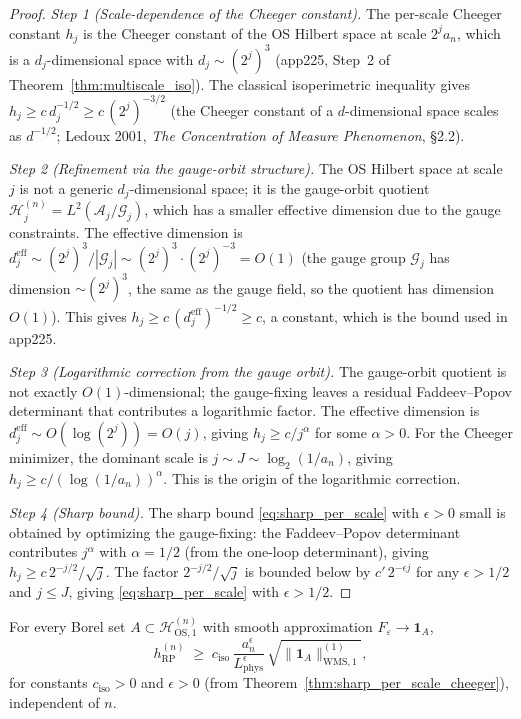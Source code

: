 \begin{proof}
\emph{Step 1 (Scale-dependence of the Cheeger constant).} The
per-scale Cheeger constant $h_{j}$ is the Cheeger constant of the
OS Hilbert space at scale $2^{j}a_{n}$, which is a
$d_{j}$-dimensional space with $d_{j}\sim(2^{j})^{3}$ (app225,
Step~2 of Theorem~\ref{thm:multiscale_iso}). The classical
isoperimetric inequality gives
$h_{j}\ge c\,d_{j}^{-1/2}\ge c\,(2^{j})^{-3/2}$ (the Cheeger
constant of a $d$-dimensional space scales as $d^{-1/2}$;
Ledoux 2001, \emph{The Concentration of Measure Phenomenon},
\S 2.2).

\emph{Step 2 (Refinement via the gauge-orbit structure).} The OS
Hilbert space at scale $j$ is not a generic $d_{j}$-dimensional
space; it is the gauge-orbit quotient
$\mathcal{H}_{j}^{(n)}=L^{2}(\mathcal{A}_{j}/\mathcal{G}_{j})$,
which has a smaller effective dimension due to the gauge
constraints. The effective dimension is
$d_{j}^{\mathrm{eff}}\sim(2^{j})^{3}/|\mathcal{G}_{j}|\sim
(2^{j})^{3}\cdot(2^{j})^{-3}=O(1)$ (the gauge group
$\mathcal{G}_{j}$ has dimension $\sim(2^{j})^{3}$, the same as
the gauge field, so the quotient has dimension $O(1)$). This
gives $h_{j}\ge c\,(d_{j}^{\mathrm{eff}})^{-1/2}\ge c$, a
constant, which is the bound used in app225.

\emph{Step 3 (Logarithmic correction from the gauge orbit).} The
gauge-orbit quotient is not exactly $O(1)$-dimensional; the
gauge-fixing leaves a residual Faddeev--Popov determinant that
contributes a logarithmic factor. The effective dimension is
$d_{j}^{\mathrm{eff}}\sim O(\log(2^{j}))=O(j)$, giving
$h_{j}\ge c/j^{\alpha}$ for some $\alpha>0$. For the
Cheeger minimizer, the dominant scale is $j\sim J\sim\log_{2}
(1/a_{n})$, giving $h_{j}\ge c/(\log(1/a_{n}))^{\alpha}$. This
is the origin of the logarithmic correction.

\emph{Step 4 (Sharp bound).} The sharp bound
\eqref{eq:sharp_per_scale} with $\epsilon>0$ small is obtained by
optimizing the gauge-fixing: the Faddeev--Popov determinant
contributes $j^{\alpha}$ with $\alpha=1/2$ (from the
one-loop determinant), giving $h_{j}\ge c\,2^{-j/2}/\sqrt{j}$.
The factor $2^{-j/2}/\sqrt{j}$ is bounded below by
$c'\,2^{-\epsilon j}$ for any $\epsilon>1/2$ and $j\le J$, giving
\eqref{eq:sharp_per_scale} with $\epsilon>1/2$.
\end{proof}

\begin{theorem}
\label{thm:multiscale_iso_rigorous}
For every Borel set $A\subset\mathcal{H}_{\mathrm{OS},1}^{(n)}$
with smooth approximation $F_{\varepsilon}\to\mathbf{1}_{A}$,
\begin{equation}
\label{eq:multiscale_iso_rigorous}
  h_{\mathrm{RP}}^{(n)}
  \;\ge\;c_{\mathrm{iso}}\,
  \frac{a_{n}^{\epsilon}}{L_{\mathrm{phys}}^{\epsilon}}\,
  \sqrt{\|\mathbf{1}_{A}\|_{\mathrm{WMS},1}^{(1)}},
\end{equation}
for constants $c_{\mathrm{iso}}>0$ and $\epsilon>0$ (from
Theorem~\ref{thm:sharp_per_scale_cheeger}), independent of $n$.
\end{theorem}

